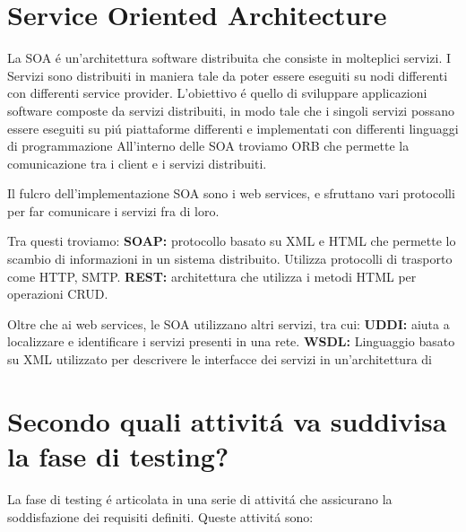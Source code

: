 \documentclass[11pt]{article}
\begin{document}
\section{Service Oriented Architecture}
\label{sec:orgcf7939e}
La SOA é un'architettura software distribuita che consiste in molteplici servizi.
I Servizi sono distribuiti in maniera tale da poter essere eseguiti su nodi differenti con differenti service provider.
L'obiettivo é quello di sviluppare applicazioni software composte da servizi distribuiti, in modo tale che i singoli servizi possano essere eseguiti su piú piattaforme differenti e implementati con differenti linguaggi di programmazione
All'interno delle SOA troviamo ORB che permette la comunicazione tra i client e i servizi distribuiti.

Il fulcro dell'implementazione SOA sono i web services, e sfruttano vari protocolli per far comunicare i servizi fra di loro.

Tra questi troviamo:
\textbf{\textbf{SOAP:}} protocollo basato su XML e HTML che permette lo scambio di informazioni in un sistema distribuito. Utilizza protocolli di trasporto come HTTP, SMTP.
\textbf{\textbf{REST:}} architettura che utilizza i metodi HTML per operazioni CRUD.

Oltre che ai web services, le SOA utilizzano altri servizi, tra cui:
\textbf{\textbf{UDDI:}} aiuta a localizzare e identificare i servizi presenti in una rete.
\textbf{\textbf{WSDL:}} Linguaggio basato su XML utilizzato per descrivere le interfacce dei servizi in un'architettura di
\section{Secondo quali attivitá va suddivisa la fase di testing?}
\label{sec:org1b44b09}
La fase di testing é articolata in una serie di attivitá che assicurano la soddisfazione dei requisiti definiti.
Queste attivitá sono:
\end{document}
